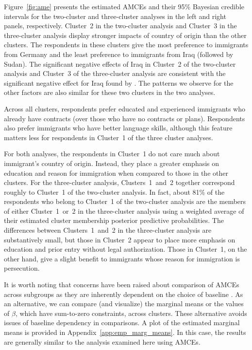 \documentclass[11pt]{article}
\begin{document}
Figure~\ref{fig:ame} presents the estimated AMCEs and their 95\%
Bayesian credible intervals for the two-cluster and three-cluster
analyses in the left and right panels, respectively. Cluster~2 in the
two-cluster analysis and Cluster~3 in the three-cluster analysis
display stronger impacts of country of origin than the other clusters.
The respondents in these clusters give the most preference to
immigrants from Germany and the least preference to immigrants from
Iraq (followed by Sudan).  The significant negative effects of Iraq in
Cluster~2 of the two-cluster analysis and Cluster~3 of the
three-cluster analysis are consistent with the significant negative
effect for Iraq found by \cite{hainmueller2015hidden}.  The patterns
we observe for the other factors are also similar for these two
clusters in the two analyses.

Across all clusters, respondents prefer educated and experienced
immigrants who already have contracts (over those who have no
contracts or plans).  Respondents also prefer immigrants who have
better language skills, although this feature matters less for
respondents in Cluster~1 of the three cluster analyses.

For both analyses, the respondents in Cluster~1 do not care much about
immigrant's country of origin.  Instead, they place a greater emphasis
on education and reason for immigration when compared to those in the
other clusters.  For the three-cluster analysis, Clusters~1~and~2
together correspond roughly to Cluster~1 of the two-cluster analysis.
In fact, about 81\% of the respondents who belong to Cluster~1 of the
two-cluster analysis are the members of either Cluster~1~or~2 in the
three-cluster analysis using a weighted average of their estimated cluster membership posterior predictive probabilities.  The differences between Clusters~1~and~2 in
the three-cluster analysis are substantively small, but those in
Cluster~2 appear to place more emphasis on education and prior entry
without legal authorization.  Those in Cluster~1, on the other hand,
give a slight benefit to immigrants whose reason for immigration is
persecution.

It is worth noting that concerns have been raised about comparison of
AMCEs across subgroups as they are inherently dependent on the choice
of baseline \citep{leeper2020measuring}.  As an alternative, we can
compare (and visualize) the marginal means or the values of $\beta$, which have
sum-to-zero constraints, across clusters.
These alternative avoids issues of baseline dependency in comparisons.
A plot of the estimated marginal means is provided in Appendix~\ref{app:emp_marg_means}.
In this case, the results are generally similar to the analysis examined here using AMCEs.
\end{document}
